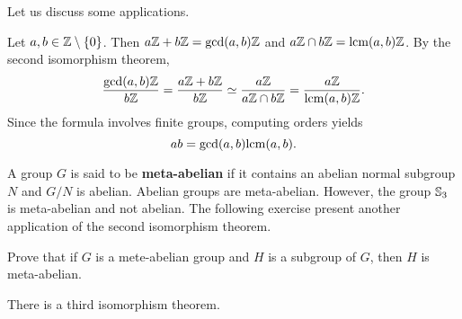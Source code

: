 Let us discuss some applications. 

\begin{example}
Let $a,b\in\mathbb{Z}\setminus\{0\}$. Then $a\mathbb{Z}+b\mathbb{Z}=\gcd(a,b)\mathbb{Z}$ and $a\mathbb{Z}\cap b\mathbb{Z}=\mathrm{lcm}(a,b)\mathbb{Z}$. By the second isomorphism theorem,
\[
\frac{\gcd(a,b)\mathbb{Z}}{b\mathbb{Z}}=\frac{a\mathbb{Z}+b\mathbb{Z}}{b\mathbb{Z}}\simeq
\frac{a\mathbb{Z}}{a\mathbb{Z}\cap b\mathbb{Z}}=\frac{a\mathbb{Z}}{\mathrm{lcm}(a,b)\mathbb{Z}}.
\]
Since the formula involves finite groups, 
computing orders yields 
\[
ab=\gcd(a,b)\mathrm{lcm}(a,b).
\]
\end{example}


A group $G$ is said to be \textbf{meta-abelian}
if it contains an abelian normal subgroup $N$ and $G/N$
is abelian. Abelian groups are meta-abelian. However, the group $\mathbb{S}_3$ is meta-abelian and not abelian.  The following exercise
present another application of the second isomorphism theorem. 

\begin{exercise}
Prove that if $G$ is a mete-abelian group and $H$ is a subgroup of
$G$, then $H$ is meta-abelian. 
\end{exercise}


There is a third isomorphism theorem. 


